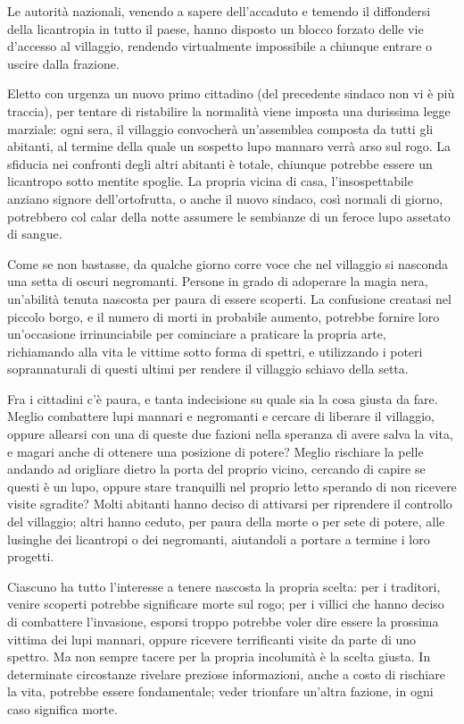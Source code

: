 \documentclass[a4paper,10pt]{article}
\begin{document}
Le autorità nazionali, venendo a sapere dell'accaduto e temendo il diffondersi
della licantropia in tutto il paese, hanno disposto un blocco forzato delle vie
d'accesso al villaggio, rendendo virtualmente impossibile a chiunque entrare o
uscire dalla frazione.

Eletto con urgenza un nuovo primo cittadino (del precedente sindaco non vi è più traccia), per tentare di ristabilire la
normalità viene imposta una durissima legge marziale: ogni sera, il villaggio
convocherà un'assemblea composta da tutti gli abitanti, al termine della quale
un sospetto lupo mannaro verrà arso sul rogo. La sfiducia nei confronti degli
altri abitanti è totale, chiunque potrebbe essere un licantropo sotto mentite
spoglie. La propria vicina di casa, l'insospettabile anziano signore
dell'ortofrutta, o anche il nuovo sindaco, così normali di giorno, potrebbero
col calar della notte assumere le sembianze di un feroce lupo assetato di
sangue.

Come se non bastasse, da qualche giorno corre voce che nel villaggio si
nasconda una setta di oscuri negromanti. Persone in grado di adoperare la magia
nera, un'abilità tenuta nascosta per paura di essere scoperti. La confusione
creatasi nel piccolo borgo, e il numero di morti in probabile aumento, potrebbe
fornire loro un'occasione irrinunciabile per cominciare a praticare la propria
arte, richiamando alla vita le vittime sotto forma di spettri, e utilizzando i
poteri soprannaturali di questi ultimi per rendere il villaggio schiavo della
setta.

Fra i cittadini c'è paura, e tanta indecisione su quale sia la cosa giusta da
fare. Meglio combattere lupi mannari e negromanti e cercare di liberare il
villaggio, oppure allearsi con una di queste due fazioni nella speranza di avere
salva la vita, e magari anche di ottenere una posizione di potere? Meglio
rischiare la pelle andando ad origliare dietro la porta del proprio vicino,
cercando di capire se questi è un lupo, oppure stare tranquilli nel proprio
letto sperando di non ricevere visite sgradite? Molti abitanti hanno deciso di
attivarsi per riprendere il controllo del villaggio; altri hanno ceduto, per
paura della morte o per sete di potere, alle lusinghe dei licantropi o dei
negromanti, aiutandoli a portare a termine i loro progetti.

Ciascuno ha tutto l'interesse a tenere nascosta la propria scelta: per i
traditori, venire scoperti potrebbe significare morte sul rogo; per i villici
che hanno deciso di combattere l'invasione, esporsi troppo potrebbe voler dire
essere la prossima vittima dei lupi mannari, oppure ricevere terrificanti visite
da parte di uno spettro. Ma non sempre tacere per la propria incolumità è la
scelta giusta. In determinate circostanze rivelare preziose informazioni, anche
a costo di rischiare la vita, potrebbe essere fondamentale; veder trionfare
un'altra fazione, in ogni caso significa morte.
\end{document}
